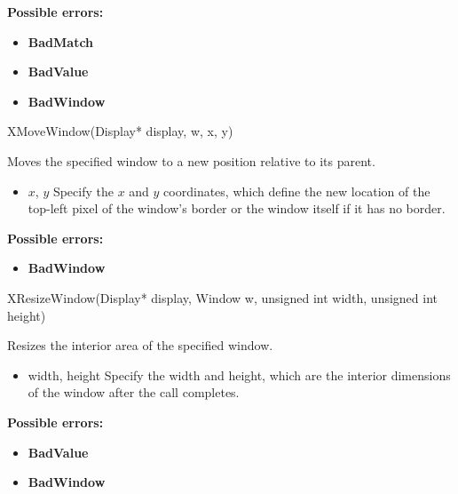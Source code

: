 \documentclass{report}
\begin{document}
\begin{itemize}
            \bigbreak \noindent
            \textbf{Possible errors:}
            \begin{itemize}
                \item \textbf{BadMatch}
                \item \textbf{BadValue}
                \item \textbf{BadWindow}
            \end{itemize}

            \begin{cppcode}
                XMoveWindow(Display* display, w, x, y)
            \end{cppcode}
            \bigbreak \noindent
            Moves the specified window to a new position relative to its parent.
            \begin{itemize}
                \item $x$, $y$ Specify the $x$ and $y$ coordinates, which define the new location of the top-left pixel of the window’s border or the window itself if it has no border.
            \end{itemize}
            \bigbreak \noindent
            \textbf{Possible errors:}
            \begin{itemize}
                \item \textbf{BadWindow}
            \end{itemize}

            \begin{cppcode}
                XResizeWindow(Display* display, Window w, unsigned int width, unsigned int height)
            \end{cppcode}
            \bigbreak \noindent
            Resizes the interior area of the specified window.

            \begin{itemize}
                \item width, height Specify the width and height, which are the interior dimensions of the window after the call completes.
            \end{itemize}

            \bigbreak \noindent
            \textbf{Possible errors:}
            \begin{itemize}
                \item \textbf{BadValue}
                \item \textbf{BadWindow}
            \end{itemize}


\end{itemize}
\end{document}
